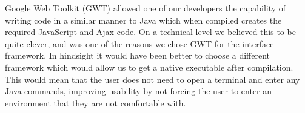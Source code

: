 Google Web Toolkit (GWT) allowed one of our developers the capability of writing
code in a similar manner to Java which when compiled creates the required
JavaScript and Ajax code.  On a technical level we believed this to be quite
clever, and was one of the reasons we chose GWT for the interface framework.
In hindsight it would have been better to choose a different framework which
would allow us to get a native executable after compilation.  This would mean
that the user does not need to open a terminal and enter any Java commands,
improving usability by not forcing the user to enter an environment that they
are not comfortable with.